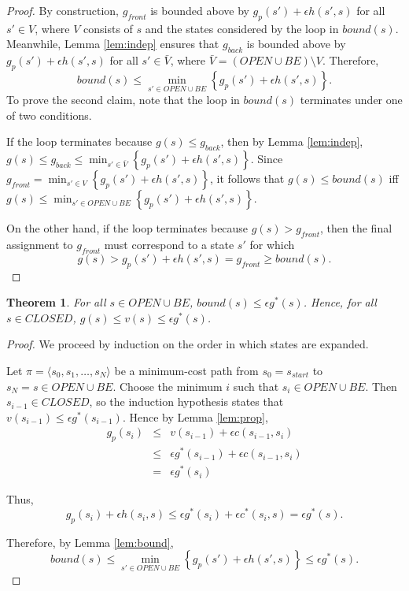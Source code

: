 \documentclass[letterpaper]{article}
\newtheorem{thm}{Theorem}
\begin{document}
\begin{proof}
By construction, $g_{front}$ is bounded above by $g_p(s') + \epsilon h(s',s)$ for all $s'\in V$, where $V$ consists of $s$ and the states considered by the loop in $bound(s)$. Meanwhile, Lemma \ref{lem:indep} ensures that $g_{back}$ is bounded above by $g_p(s') + \epsilon h(s',s)$ for all $s'\in \bar V$, where $\bar V = (OPEN \cup BE) \setminus V$. Therefore,
\[bound(s) \le \min_{s' \in OPEN \cup BE} \left\{g_p(s') + \epsilon h(s',s)\right\}.\]
To prove the second claim, note that the loop in $bound(s)$ terminates under one of two conditions.

If the loop terminates because $g(s) \le g_{back}$, then by Lemma \ref{lem:indep}, $g(s) \le g_{back} \le \min_{s'\in \bar V} \left\{ g_p(s') + \epsilon h(s',s) \right\}$. Since $g_{front} = \min_{s'\in V} \left\{ g_p(s') + \epsilon h(s',s) \right\}$, it follows that $g(s) \le bound(s)$ iff $g(s) \le \min_{s'\in OPEN \cup BE} \left\{ g_p(s') + \epsilon h(s',s) \right\}$.

On the other hand, if the loop terminates because $g(s) > g_{front}$, then the final assignment to $g_{front}$ must correspond to a state $s'$ for which
\[g(s) > g_p(s') + \epsilon h(s',s) = g_{front} \ge bound(s).\]
\end{proof}

\begin{thm}
\label{thm:subopt}
For all $s\in OPEN\cup BE$, $bound(s) \le \epsilon g^*(s)$. Hence, for all $s\in CLOSED$, $g(s) \le v(s) \le \epsilon g^*(s)$.
\end{thm}

\begin{proof}
We proceed by induction on the order in which states are expanded.

Let $\pi = \langle s_0,s_1,\ldots,s_N \rangle$ be a minimum-cost path from $s_0 = s_{start}$ to $s_N = s\in OPEN\cup BE$. Choose the minimum $i$ such that $s_i\in OPEN\cup BE$. Then $s_{i-1}\in CLOSED$, so the induction hypothesis states that $v(s_{i-1}) \le \epsilon g^*(s_{i-1})$. Hence by Lemma \ref{lem:prop},
\begin{eqnarray*}
g_p(s_i) &\le& v(s_{i-1}) + \epsilon c(s_{i-1},s_i)
\\&\le& \epsilon g^*(s_{i-1}) + \epsilon c(s_{i-1},s_i)
\\&=& \epsilon g^*(s_i)
\end{eqnarray*}

Thus,
\[g_p(s_i) + \epsilon h(s_i,s) \le \epsilon g^*(s_i) + \epsilon c^*(s_i,s) = \epsilon g^*(s).\]

Therefore, by Lemma \ref{lem:bound},
\[bound(s) \le \min_{s' \in OPEN \cup BE} \left\{g_p(s') + \epsilon h(s',s)\right\} \le \epsilon g^*(s).\]
\end{proof}
\end{document}
